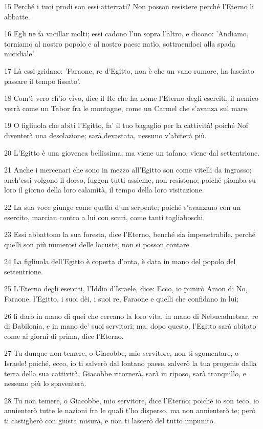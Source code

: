 \par 15 Perché i tuoi prodi son essi atterrati? Non posson resistere perché l'Eterno li abbatte.
\par 16 Egli ne fa vacillar molti; essi cadono l'un sopra l'altro, e dicono: 'Andiamo, torniamo al nostro popolo e al nostro paese natìo, sottraendoci alla spada micidiale'.
\par 17 Là essi gridano: 'Faraone, re d'Egitto, non è che un vano rumore, ha lasciato passare il tempo fissato'.
\par 18 Com'è vero ch'io vivo, dice il Re che ha nome l'Eterno degli eserciti, il nemico verrà come un Tabor fra le montagne, come un Carmel che s'avanza sul mare.
\par 19 O figliuola che abiti l'Egitto, fa' il tuo bagaglio per la cattività! poiché Nof diventerà una desolazione; sarà devastata, nessuno v'abiterà più.
\par 20 L'Egitto è una giovenca bellissima, ma viene un tafano, viene dal settentrione.
\par 21 Anche i mercenari che sono in mezzo all'Egitto son come vitelli da ingrasso; anch'essi volgono il dorso, fuggon tutti assieme, non resistono; poiché piomba su loro il giorno della loro calamità, il tempo della loro visitazione.
\par 22 La sua voce giunge come quella d'un serpente; poiché s'avanzano con un esercito, marcian contro a lui con scuri, come tanti tagliaboschi.
\par 23 Essi abbattono la sua foresta, dice l'Eterno, benché sia impenetrabile, perché quelli son più numerosi delle locuste, non si posson contare.
\par 24 La figliuola dell'Egitto è coperta d'onta, è data in mano del popolo del settentrione.
\par 25 L'Eterno degli eserciti, l'Iddio d'Israele, dice: Ecco, io punirò Amon di No, Faraone, l'Egitto, i suoi dèi, i suoi re, Faraone e quelli che confidano in lui;
\par 26 li darò in mano di quei che cercano la loro vita, in mano di Nebucadnetsar, re di Babilonia, e in mano de' suoi servitori; ma, dopo questo, l'Egitto sarà abitato come ai giorni di prima, dice l'Eterno.
\par 27 Tu dunque non temere, o Giacobbe, mio servitore, non ti sgomentare, o Israele! poiché, ecco, io ti salverò dal lontano paese, salverò la tua progenie dalla terra della sua cattività; Giacobbe ritornerà, sarà in riposo, sarà tranquillo, e nessuno più lo spaventerà.
\par 28 Tu non temere, o Giacobbe, mio servitore, dice l'Eterno; poiché io son teco, io annienterò tutte le nazioni fra le quali t'ho disperso, ma non annienterò te; però ti castigherò con giusta misura, e non ti lascerò del tutto impunito.

